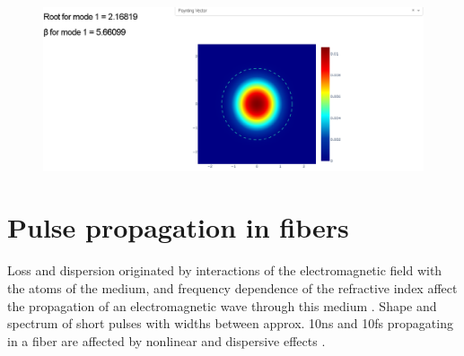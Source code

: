\begin{figure}[label={fig:fibre2}, caption={\href{https://fiber-mode-app.herokuapp.com/apps/results}{Heroku app} for the optical fiber (2).}]
	\includegraphics[width=.8\textwidth]{figures/chap2/fibre2.PNG} 
\end{figure}


   


\section{Pulse propagation in fibers}

Loss and dispersion originated by interactions of the electromagnetic field with the atoms of the medium, and frequency dependence of the refractive index affect the propagation of an electromagnetic wave through this medium \citep{dudley_taylor_2010}. Shape and spectrum of short pulses with widths between approx. 10ns and 10fs propagating in a fiber are affected by nonlinear and dispersive effects \citep{AgrawalBook}.  

